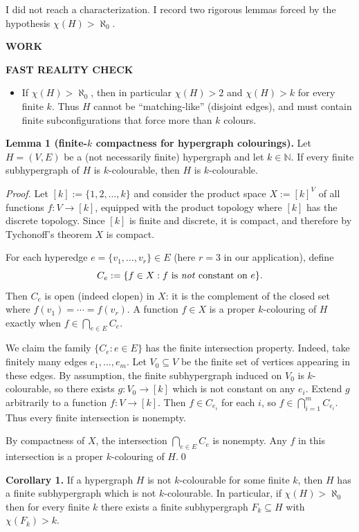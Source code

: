 I did not reach a characterization. I record two rigorous lemmas forced by the hypothesis $\chi(H)>\aleph_0$.

\bigskip
\noindent\textbf{WORK}

\medskip
\noindent\textbf{FAST REALITY CHECK}

\begin{itemize}
\item If $\chi(H)>\aleph_0$, then in particular $\chi(H)>2$ and $\chi(H)>k$ for every finite $k$. Thus $H$ cannot be ``matching-like'' (disjoint edges), and must contain finite subconfigurations that force more than $k$ colours.
\end{itemize}

\medskip
\noindent\textbf{Lemma 1 (finite-$k$ compactness for hypergraph colourings).}\label{lem:hypergraph_compactness}
Let $H=(V,E)$ be a (not necessarily finite) hypergraph and let $k\in\mathbb{N}$.
If every finite subhypergraph of $H$ is $k$-colourable, then $H$ is $k$-colourable.

\emph{Proof.}
Let $[k]:=\{1,2,\dots,k\}$ and consider the product space $X:=[k]^V$ of all functions $f:V\to[k]$, equipped with the product topology where $[k]$ has the discrete topology.
Since $[k]$ is finite and discrete, it is compact, and therefore by Tychonoff's theorem $X$ is compact.

For each hyperedge $e=\{v_1,\dots,v_r\}\in E$ (here $r=3$ in our application), define
\[
C_e:=\{f\in X: \text{$f$ is \emph{not} constant on $e$}\}.
\]
Then $C_e$ is open (indeed clopen) in $X$: it is the complement of the closed set where $f(v_1)=\cdots=f(v_r)$.
A function $f\in X$ is a proper $k$-colouring of $H$ exactly when $f\in\bigcap_{e\in E} C_e$.

We claim the family $\{C_e:e\in E\}$ has the finite intersection property.
Indeed, take finitely many edges $e_1,\dots,e_m$.
Let $V_0\subseteq V$ be the finite set of vertices appearing in these edges.
By assumption, the finite subhypergraph induced on $V_0$ is $k$-colourable, so there exists $g:V_0\to[k]$ which is not constant on any $e_i$.
Extend $g$ arbitrarily to a function $f:V\to[k]$.
Then $f\in C_{e_i}$ for each $i$, so $f\in\bigcap_{i=1}^m C_{e_i}$.
Thus every finite intersection is nonempty.

By compactness of $X$, the intersection $\bigcap_{e\in E} C_e$ is nonempty.
Any $f$ in this intersection is a proper $k$-colouring of $H$.\qed

\medskip
\noindent\textbf{Corollary 1.}\label{cor:finite_obstructions}
If a hypergraph $H$ is not $k$-colourable for some finite $k$, then $H$ has a finite subhypergraph which is not $k$-colourable.
In particular, if $\chi(H)>\aleph_0$ then for every finite $k$ there exists a finite subhypergraph $F_k\subseteq H$ with $\chi(F_k)>k$.

